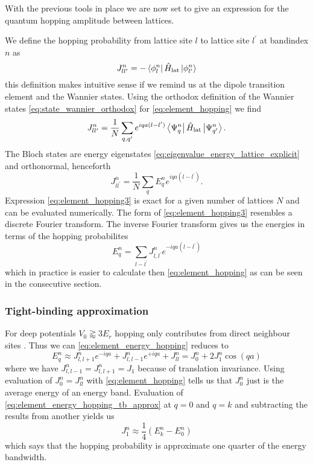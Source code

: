 With the previous tools in place we are now set to give an expression for the
quantum hopping amplitude between lattices.

We define the hopping probability from lattice site $l$ to lattice site
$l^\prime$ at bandindex $n$ as
\begin{equation}
  J^n_{ll^\prime}
  =-\bra{\phi^n_l}\hat{H}_\text{lat}\ket{\phi^n_{l^\prime}}
  \label{eq:element_hopping}
\end{equation}
this definition makes intuitive sense if we remind us at the dipole transition
element and the Wannier states. Using the orthodox definition of the Wannier
states \cref{eq:state_wannier_orthodox} for \cref{eq:element_hopping} we find
\begin{equation}
  J^n_{ll^\prime}
  =\frac{1}{N}\sum_{q,q^\prime}e^{iqa(l-l^\prime)}
  \bra{\Psi^n_q}\hat{H}_\text{lat}\ket{\Psi^n_{q^\prime}}
  \label{eq:element_hopping2}.
\end{equation}
The Bloch states are energy eigenstates
\cref{eq:eigenvalue_energy_lattice_explicit} and orthonormal, henceforth
\begin{equation}
  J^n_{ll^\prime}
  =\frac{1}{N}\sum_{q}E^n_qe^{iqa(l-l^\prime)}
  \label{eq:element_hopping3}.
\end{equation}
Expression \cref{eq:element_hopping3} is exact for a given number of lattices
$N$ and can be evaluated numerically. The form of \cref{eq:element_hopping3}
resembles a discrete Fourier transform. The inverse Fourier transform gives us
the energies in terms of the hopping probabilites
\begin{equation}
  E^n_q
  =\sum_{l-l^\prime}J^n_{l,l^\prime}e^{-iqa(l-l^\prime)}
  \label{eq:element_energy_hopping}
\end{equation}
which in practice is easier to calculate then \cref{eq:element_hopping} as
can be seen in the consecutive section.

\subsubsection{Tight-binding approximation}

For deep potentials $V_0\gtrapprox3E_r$ hopping only contributes from direct
neighbour sites \cite{Rom2009}. Thus we can \cref{eq:element_energy_hopping}
reduces to
\begin{equation}
  E^n_q
  \approx J^n_{l,l+1}e^{-iqa}+J^n_{l,l-1}e^{+iqa}+J^n_{ll}
  =J^n_0+2J^n_1\cos(qa)
  \label{eq:element_energy_hopping_tb_approx}
\end{equation}
where we have $J^n_{l,l-1}=J^n_{l,l+1}=J_1$ because of translation invariance.
Using evaluation of $J^n_0=J^n_{ll}$ with \cref{eq:element_hopping} tells us
that $J^n_0$ just is the average energy of an energy band. Evaluation of
\cref{eq:element_energy_hopping_tb_approx} at $q=0$ and $q=k$ and subtracting
the results from another yields us
\begin{equation}
  J^n_1\approx\frac{1}{4}\left(E^n_k-E^n_0\right)
  \label{eq:hopping_amplitude_energies}
\end{equation}
which says that the hopping probability is approximate one quarter of the
energy bandwidth.


